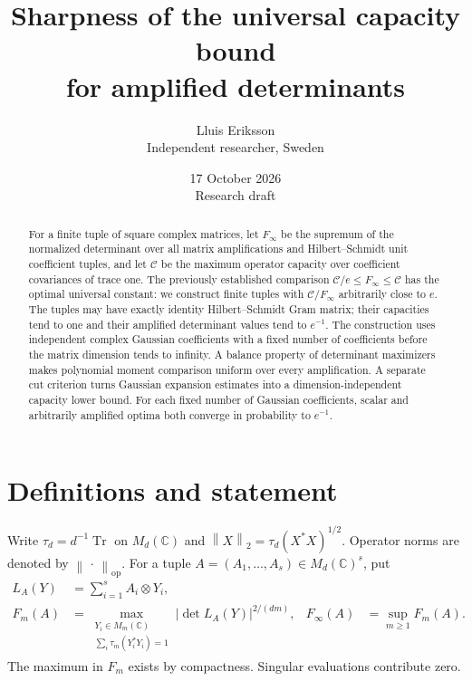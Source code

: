 \documentclass[11pt]{article}
\title{Sharpness of the universal capacity bound\\
for amplified determinants}
\author{Lluis Eriksson\\
\small Independent researcher, Sweden}
\date{17 October 2026\\ \small Research draft}
\theoremstyle{remark}
\DeclareMathOperator{\Tr}{Tr}
\newcommand{\C}{\mathbb C}
\newcommand{\M}{M}
\newcommand{\op}{\mathrm{op}}
\newcommand{\Finf}{F_{\infty}}
\newcommand{\calC}{\mathcal C}
\newcommand{\norm}[1]{\left\lVert#1\right\rVert}
\newcommand{\abs}[1]{\left\lvert#1\right\rvert}
\begin{document}
\maketitle

\begin{abstract}
For a finite tuple of square complex matrices, let $\Finf$ be the
supremum of the normalized determinant over all matrix amplifications
and Hilbert--Schmidt unit coefficient tuples, and let $\calC$ be the
maximum operator capacity over coefficient covariances of trace one.
The previously established comparison
$\calC/e\leq\Finf\leq\calC$ has the optimal universal constant:
we construct finite tuples with $\calC/\Finf$ arbitrarily close to $e$.
The tuples may have exactly identity Hilbert--Schmidt Gram matrix;
their capacities tend to one and their amplified determinant values
tend to $e^{-1}$. The construction uses independent complex Gaussian
coefficients with a fixed number of coefficients before the matrix
dimension tends to infinity. A balance property of determinant
maximizers makes polynomial moment comparison uniform over every
amplification. A separate cut criterion turns Gaussian expansion
estimates into a dimension-independent capacity lower bound.
For each fixed number of Gaussian coefficients, scalar and
arbitrarily amplified optima both converge in probability to $e^{-1}$.
\end{abstract}

\section{Definitions and statement}

Write $\tau_d=d^{-1}\Tr$ on $\M_d(\C)$ and
$\norm{X}_2=\tau_d(X^*X)^{1/2}$. Operator norms are denoted by
$\norm{\,\cdot\,}_{\op}$. For a tuple
$A=(A_1,\ldots,A_s)\in\M_d(\C)^s$, put
\begin{align}
 L_A(Y)&=\sum_{i=1}^s A_i\otimes Y_i, \label{eq:pencil}\\
 F_m(A)&=
 \max_{\substack{Y_i\in\M_m(\C)\\
             \sum_i\tau_m(Y_i^*Y_i)=1}}
       \abs{\det L_A(Y)}^{2/(dm)},&
 \Finf(A)&=\sup_{m\geq1}F_m(A). \label{eq:F}
\end{align}
The maximum in $F_m$ exists by compactness. Singular evaluations
contribute zero.
\end{document}

